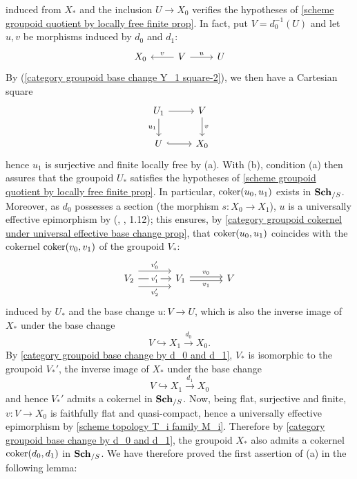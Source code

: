 induced from $X_*$ and the inclusion $U\to X_0$ verifies the hypotheses of \cref{scheme groupoid quotient by locally free finite prop}. In fact, put $V=d_0^{-1}(U)$ and let $u,v$ be morphisms induced by $d_0$ and $d_1$:
\[\begin{tikzcd}
X_0&V\ar[r,"u"]\ar[l,swap,"v"]&U
\end{tikzcd}\]
By (\ref{category groupoid base change Y_1 square-2}), we then have a Cartesian square
\[\begin{tikzcd}
U_1\ar[r]\ar[d,swap,"u_1"]&V\ar[d,"v"]\\
U\ar[r,hook]&X_0
\end{tikzcd}\]
hence $u_1$ is surjective and finite locally free by (a). With (b), condition (a) then assures that the groupoid $U_*$ satisfies the hypotheses of \cref{scheme groupoid quotient by locally free finite prop}. In particular, $\operatorname{coker}(u_0,u_1)$ exists in $\mathbf{Sch}_{/S}$. Moreover, as $d_0$ possesses a section (the morphism $s:X_0\to X_1$), $u$ is a universally effective epimorphism by (\cite{SGA3-1}, , 1.12); this ensures, by \cref{category groupoid cokernel under universal effective base change prop}, that $\operatorname{coker}(u_0,u_1)$ coincides with the cokernel $\operatorname{coker}(v_0,v_1)$ of the groupoid $V_*$:
\[\begin{tikzcd}[column sep=12mm]
V_2\ar[r,shift left=8pt,"v_0'"]\ar[r,shift right=8pt,swap,"v_2'"]\ar[r,"v_1'"description]&V_1\ar[r,shift left=2pt,"v_0"]\ar[r,shift right=2pt,swap,"v_1"]&V
\end{tikzcd}\]
induced by $U_*$ and the base change $u:V\to U$, which is also the inverse image of $X_*$ under the base change
\[V\hookrightarrow X_1\stackrel{d_0}{\to} X_0.\]
By \cref{category groupoid base change by d_0 and d_1}, $V_*$ is isomorphic to the groupoid $V_*'$, the inverse image of $X_*$ under the base change
\[V\hookrightarrow X_1\stackrel{d_1}{\to} X_0\]
and hence $V_*'$ admits a cokernel in $\mathbf{Sch}_{/S}$. Now, being flat, surjective and finite, $v:V\to X_0$ is faithfully flat and quasi-compact, hence a universally effective epimorphism by \cref{scheme topology T_i family M_i}. Therefore by \cref{category groupoid base change by d_0 and d_1}, the groupoid $X_*$ also admits a cokernel $\operatorname{coker}(d_0,d_1)$ in $\mathbf{Sch}_{/S}$. We have therefore proved the first assertion of (a) in the following lemma:

